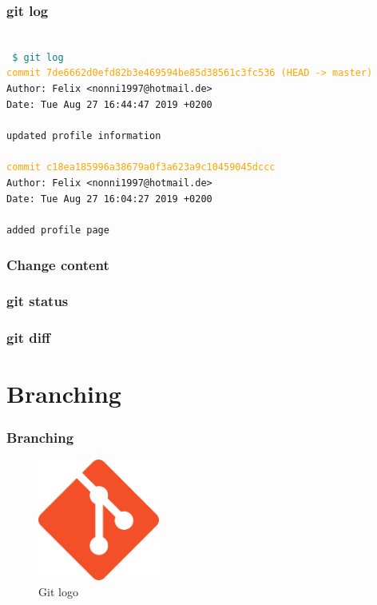 \documentclass[aspectratio=169]{beamer}
\newcommand{\shellcmd}[1]{~\\ \indent\indent\texttt{\textcolor{teal}{ \$ #1}\\}}
\begin{document}

\begin{frame}
\frametitle{git log}
\shellcmd{git log}
\texttt{\textcolor{orange}{commit 7de6662d0efd82b3e469594be85d38561c3fc536 (HEAD -> master)}\\
	Author: Felix <nonni1997@hotmail.de>\\
	Date:   Tue Aug 27 16:44:47 2019 +0200\\
	~\\
	updated profile information\\
	~\\
	\textcolor{orange}{commit c18ea185996a38679a0f3a623a9c10459045dccc}\\
	Author: Felix <nonni1997@hotmail.de>\\
	Date:   Tue Aug 27 16:04:27 2019 +0200\\
	~\\
	added profile page
}
\end{frame}


\begin{frame}
\frametitle{Change content}
\end{frame}


\begin{frame}
\frametitle{git status}
\end{frame}


\begin{frame}
\frametitle{git diff}
\end{frame}


\section{Branching}

\begin{frame}
\frametitle{Branching}
\centering
\begin{figure}
	\includegraphics[width=4cm]{graphics/git_logo.png}
	\caption{Git logo}
\end{figure}

\end{frame}
\end{document}
